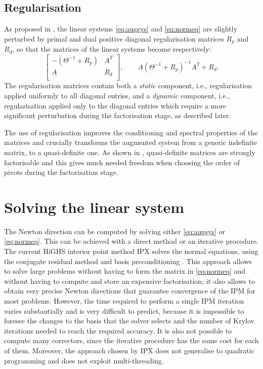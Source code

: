 \documentclass[a4paper]{article}
\newcommand{\0}{\mathbf 0}
\begin{document}
\subsection{Regularisation}
As proposed in \cite{AltGon:regularization}, the linear systems \eqref{eq:augsys} and \eqref{eq:normeq} are slightly perturbed by primal and dual positive diagonal regularisation matrices $R_p$ and $R_d$, so that the matrices of the linear systems become respectively:
\begin{equation}
\label{eq:regul_matrix}
\begin{bmatrix}
-(\Theta^{-1}+R_p) & A^T \\ A & R_d\\
\end{bmatrix},
\qquad
A(\Theta^{-1}+R_p)^{-1} A^T + R_d.
\end{equation}
The regularisation matrices contain both a {\it static} component, i.e., regularisation applied uniformly to all diagonal entries, and a {\it dynamic} component, i.e., regularisation applied only to the diagonal entries which require a more significant perturbation during the factorisation stage, as described later.

The use of regularisation improves the conditioning and spectral properties of the matrices \cite{Gon:matrixfree} and crucially transforms the augmented system from a generic indefinite matrix, to a quasi-definite one. As shown in \cite{Van:quasidefinite}, quasi-definite matrices are strongly factorisable and this gives much needed freedom when choosing the order of pivots during the factorisation stage.


\section{Solving the linear system}
\label{sec:linearsystem}

The Newton direction can be computed by solving either \eqref{eq:augsys} or \eqref{eq:normeq}. This can be achieved with a direct method or an iterative procedure. The current HiGHS interior point method IPX solves the normal equations, using the conjugate residual method and basis preconditioning \cite{SchGon:basisIPM}. This approach allows to solve large problems without having to form the matrix in \eqref{eq:normeq} and without having to compute and store an expensive factorisation; it also allows to obtain very precise Newton directions that guarantee convergence of the IPM for most problems. However, the time required to perform a single IPM iteration varies substantially and is very difficult to predict, because it is impossible to foresee the changes to the basis that the solver selects and the number of Krylov iterations needed to reach the required accuracy. It is also not possible to compute many correctors, since the iterative procedure has the same cost for each of them. Moreover, the approach chosen by IPX does not generalise to quadratic programming and does not exploit multi-threading.
\end{document}
